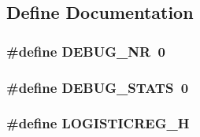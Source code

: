 \subsection{Define Documentation}
\hypertarget{lr_8hh_a0282c129efbe63bb2e3358602d69b680}{
\subsubsection[{DEBUG\_\-NR}]{\setlength{\rightskip}{0pt plus 5cm}\#define DEBUG\_\-NR~0}}
\label{lr_8hh_a0282c129efbe63bb2e3358602d69b680}
\hypertarget{lr_8hh_af37dddc82c37151b47b31f10ff3a0e65}{
\subsubsection[{DEBUG\_\-STATS}]{\setlength{\rightskip}{0pt plus 5cm}\#define DEBUG\_\-STATS~0}}
\label{lr_8hh_af37dddc82c37151b47b31f10ff3a0e65}
\hypertarget{lr_8hh_a16e471ed181626938449f38642992bb0}{
\subsubsection[{LOGISTICREG\_\-H}]{\setlength{\rightskip}{0pt plus 5cm}\#define LOGISTICREG\_\-H}}
\label{lr_8hh_a16e471ed181626938449f38642992bb0}
